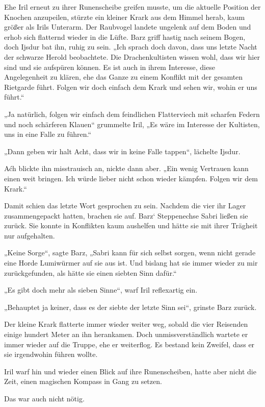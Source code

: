 Ehe Iril erneut zu ihrer Runenscheibe greifen musste, um die aktuelle Position der Knochen anzupeilen, stürzte ein kleiner Krark aus dem Himmel herab, kaum größer als Irils Unterarm. Der Raubvogel landete ungelenk auf dem Boden und erhob sich flatternd wieder in die Lüfte. Barz griff hastig nach seinem Bogen, doch Ijsdur bat ihn, ruhig zu sein. „Ich sprach doch davon, dass uns letzte Nacht der schwarze Herold beobachtete. Die Drachenkultisten wissen wohl, dass wir hier sind und sie aufspüren können. Es ist auch in ihrem Interesse, diese Angelegenheit zu klären, ehe das Ganze zu einem Konflikt mit der gesamten Rietgarde führt. Folgen wir doch einfach dem Krark und sehen wir, wohin er uns führt.“

„Ja natürlich, folgen wir einfach dem feindlichen Flatterviech mit scharfen Federn und noch schärferen Klauen“ grummelte Iril, „Es wäre im Interesse der Kultisten, uns in eine Falle zu führen.“

„Dann geben wir halt Acht, dass wir in keine Falle tappen“, lächelte Ijsdur.

Aćh blickte ihn misstrauisch an, nickte dann aber. „Ein wenig Vertrauen kann einen weit bringen. Ich würde lieber nicht schon wieder kämpfen. Folgen wir dem Krark.“

Damit schien das letzte Wort gesprochen zu sein. Nachdem die vier ihr Lager zusammengepackt hatten, brachen sie auf. Barz‘ Steppenechse Sabri ließen sie zurück. Sie konnte in Konflikten kaum aushelfen und hätte sie mit ihrer Trägheit nur aufgehalten.

„Keine Sorge“, sagte Barz, „Sabri kann für sich selbst sorgen, wenn nicht gerade eine Horde Lumiwürmer auf sie aus ist. Und bislang hat sie immer wieder zu mir zurückgefunden, als hätte sie einen siebten Sinn dafür.“

„Es gibt doch mehr als sieben Sinne“, warf Iril reflexartig ein.

„Behauptet ja keiner, dass es der siebte der letzte Sinn sei“, grinste Barz zurück.

Der kleine Krark flatterte immer wieder weiter weg, sobald die vier Reisenden einige hundert Meter an ihn herankamen. Doch unmissverständlich wartete er immer wieder auf die Truppe, ehe er weiterflog. Es bestand kein Zweifel, dass er sie irgendwohin führen wollte.

Iril warf hin und wieder einen Blick auf ihre Runenscheiben, hatte aber nicht die Zeit, einen magischen Kompass in Gang zu setzen.

Das war auch nicht nötig.

